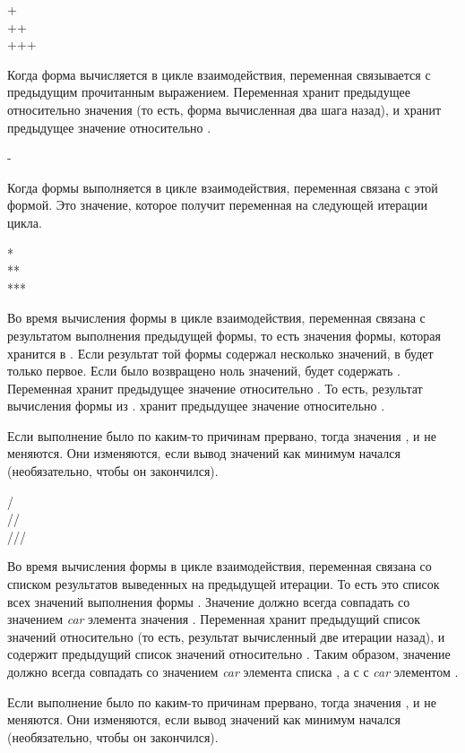 \begin{defun}[Variable]
+ \\
++ \\
+++ 

Когда форма вычисляется в цикле взаимодействия, переменная \cdf{+} связывается с
предыдущим прочитанным выражением.
Переменная \cdf{++} хранит предыдущее относительно значения \cdf{+} (то есть,
форма вычисленная два шага назад), и \cdf{+++} хранит предыдущее значение
относительно \cdf{++}.
\end{defun}

\begin{defun}[Variable]
-

Когда формы выполняется в цикле взаимодействия, переменная \cdf{-} связана с
этой формой. Это значение, которое получит переменная \cdf{+} на следующей
итерации цикла.
\end{defun}

\begin{defun}[Variable]
* \\
** \\
***

Во время вычисления формы в цикле взаимодействия, переменная \cdf{*} связана с
результатом выполнения предыдущей формы, то есть значения формы, которая
хранится в \cdf{+}.
Если результат той формы содержал несколько значений, в \cdf{*} будет только
первое. Если было возвращено ноль значений, \cdf{*} будет содержать {\nil}.
Переменная \cdf{**} хранит предыдущее значение относительно \cdf{*}. То есть,
результат вычисления формы из \cdf{**}. \cdf{***} хранит предыдущее значение
относительно \cdf{***}.

Если выполнение \cdf{+} было по каким-то причинам прервано, тогда значения
\cdf{*}, \cdf{**} и \cdf{***} не меняются.
Они изменяются, если вывод значений как минимум начался (необязательно, чтобы он
закончился).
\end{defun}

\begin{defun}[Variable]
/ \\
// \\
///

Во время вычисления формы в цикле взаимодействия,
переменная \cdf{/} связана со списком результатов выведенных на предыдущей
итерации. То есть это список всех значений выполнения формы \cdf{+}.
Значение \cdf{*} должно всегда совпадать со значением \emph{car} элемента
значения \cdf{/}.
Переменная \cdf{//} хранит предыдущий список значений относительно \cdf{/} (то
есть, результат вычисленный две итерации назад), и \cdf{///} содержит предыдущий
список значений относительно \cdf{///}. Таким образом, значение \cdf{**} должно
всегда совпадать со значением \emph{car} элемента списка \cdf{//}, а \cdf{***} с
с \emph{car} элементом \cdf{///}. 

Если выполнение \cdf{+} было по каким-то причинам прервано, тогда значения
\cdf{/}, \cdf{//} и \cdf{///} не меняются.
Они изменяются, если вывод значений как минимум начался (необязательно, чтобы он
закончился).
\end{defun}

